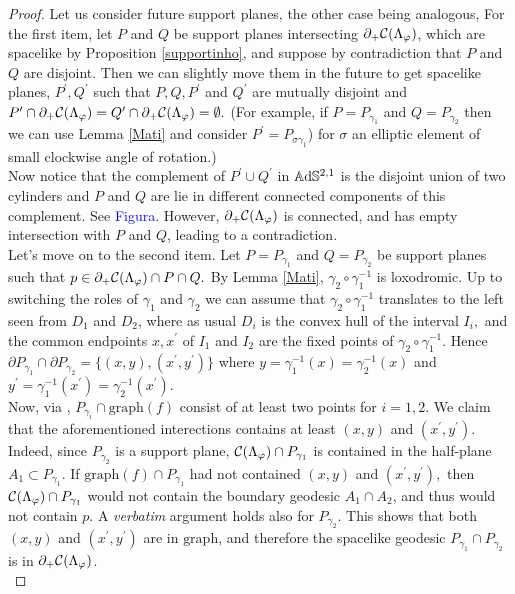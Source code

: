 \begin{proof}
    Let us consider future support planes, the other case being analogous, For the first item, let $P$ and $Q$ be support planes intersecting $\partial_+\mathcal{C}(\Lambda_\varphi)$, which are spacelike by Proposition \ref{supportinho}, and suppose by contradiction that $P$ and $Q$ are disjoint. Then we can slightly move them in the future to get spacelike planes, $P^{\prime}, Q^{\prime}$ such that $P,Q,P^{\prime}$ and $Q^{\prime}$ are mutually disjoint and $P^{\prime}\cap \partial_+\mathcal{C}(\Lambda_\varphi)=Q^{\prime}\cap\partial_+\mathcal{C}(\Lambda_\varphi)=\emptyset.$ (For example, if $P=P_{\gamma_1}$ and $Q=P_{\gamma_2}$ then we can use Lemma \ref{Mati} and consider $P^{\prime}=P_{\sigma\gamma_1}$) for $\sigma$ an elliptic element of small clockwise angle of rotation.)\\
    Now notice that the complement of $P^{\prime}\cup Q^{\prime}$ in $\mathbb{A}\mathrm{d}\mathbb{S}^{2,1}$ is the disjoint union of two cylinders and $P$ and $Q$ are lie in different connected components of this complement. See \textcolor{blue}{Figura}. However, $\partial_+\mathcal{C}(\Lambda_\varphi)$ is connected, and has empty intersection with $P$ and $Q$, leading to a contradiction. \\
    Let's move on to the second item. Let $P=P_{\gamma_1}$ and $Q=P_{\gamma_2}$ be support planes such that $p\in\partial_+\mathcal{C}(\Lambda_\varphi)\cap P\cap Q.$ By Lemma \ref{Mati}, $\gamma_2\circ\gamma_1^{-1}$ is loxodromic.  Up to switching the roles of $\gamma_1$ and $\gamma_2$ we can assume that $\gamma_2\circ\gamma_1^{-1}$ translates to the left seen from $D_1$ and $D_2$, where as usual $D_i$ is the convex hull of the interval $I_i,$ and the common endpoints $x,x^{\prime}$ of $I_1$ and $I_2$ are the fixed points of $\gamma_2\circ\gamma_1^{-1}.$ Hence $\partial P_{\gamma_1}\cap\partial P_{\gamma_2}=\{(x,y),(x^{\prime}, y^{\prime})\}$ where $y=\gamma_1^{-1}(x)=\gamma_2^{-1}(x)$ and $y^{\prime}=\gamma_1^{-1}(x^{\prime})=\gamma_2^{-1}(x^{\prime})$. \\
    Now, via , $P_{\gamma_i}\cap\text{graph}(f)$ consist of at least two points for $i=1,2$. We claim that the aforementioned interections contains at least $(x,y)$ and $(x^{\prime},y^{\prime})$. Indeed, since $P_{\gamma_2}$ is a support plane, $\mathcal{C}(\Lambda_\varphi)\cap P_{\gamma_1}$ is contained in the half-plane $A_1 \subset P_{\gamma_1}.$ If $\text{graph}(f)\cap P_{\gamma_1}$ had not contained $(x,y)$ and $(x^{\prime} ,y^{\prime}),$ then $\mathcal{C}(\Lambda_\varphi)\cap P_{\gamma_1}$ would not contain the boundary geodesic $A_1 \cap A_2$, and thus would not contain $p$. A \textit{verbatim} argument holds also for $P_{\gamma_2}$. This shows that both $(x,y)$ and $(x^{\prime},y^{\prime})$ are in $\text{graph}$, and therefore the spacelike geodesic $P_{\gamma_1}\cap P_{\gamma_2}$ is in $\partial_+\mathcal{C}(\Lambda_\varphi)$. \\ 
\end{proof}

